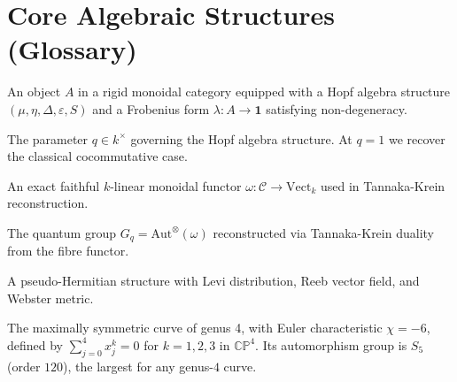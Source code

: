 \chapter{Core Algebraic Structures (Glossary)}

\begin{definition}
  \label{def:frobenius-hopf}
  An object $A$ in a rigid monoidal category equipped with a Hopf
  algebra structure $(\mu, \eta, \Delta, \varepsilon, S)$ and a
  Frobenius form $\lambda : A \to \mathbf{1}$ satisfying non-degeneracy.
\end{definition}

\begin{definition}
  \label{def:quantum-parameter}
  The parameter $q \in k^\times$ governing the Hopf algebra structure.
  At $q = 1$ we recover the classical cocommutative case.
\end{definition}

\begin{definition}
  \label{def:fibre-functor}
  An exact faithful $k$-linear monoidal functor
  $\omega : \mathcal{C} \to \mathrm{Vect}_k$ used in Tannaka-Krein
  reconstruction.
\end{definition}

\begin{definition}
  \label{def:quantum-gauge-group}
  The quantum group $G_q = \mathrm{Aut}^{\otimes}(\omega)$ reconstructed
  via Tannaka-Krein duality from the fibre functor.
\end{definition}

\begin{definition}
  \label{def:cr-manifold}
  A pseudo-Hermitian structure with Levi distribution, Reeb vector
  field, and Webster metric.
\end{definition}

\begin{definition}
  \label{def:brings-surface}
  The maximally symmetric curve of genus 4, with Euler
  characteristic $\chi = -6$, defined by $\sum_{j=0}^{4} x_j^k = 0$ for
  $k = 1,2,3$ in $\mathbb{CP}^4$.  Its automorphism group is
  $S_5$ (order $120$), the largest for any genus-$4$ curve.
\end{definition}

